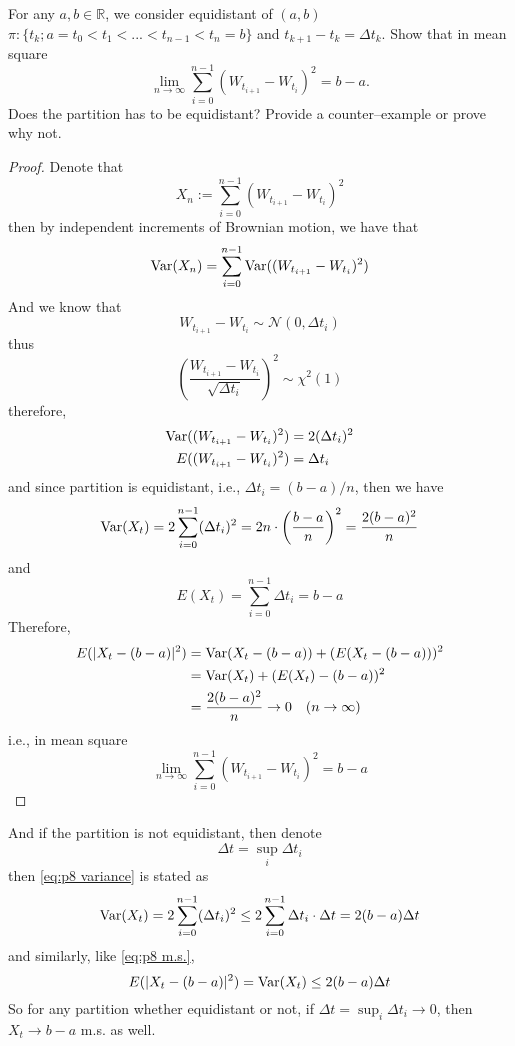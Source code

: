     \problem
    \begin{question}
        For any $a,b\in\mathbb R$, we consider equidistant of $(a,b)$
        $\pi:\{t_k; a=t_0<t_1<...<t_{n-1}<t_n=b\}$ and $t_{k+1}-t_k=\Delta t_k$.
        Show that in mean square
        \[\lim_{n\rightarrow\infty}\sum_{i=0}^{n-1}(W_{t_{i+1}}-W_{t_{i}})^2=b-a.\]
        Does the partition has to be equidistant? Provide a counter--example or prove why not.
    \end{question}
    \begin{proof}
        Denote that
        \[X_n:=\sum_{i=0}^{n-1}(W_{t_{i+1}}-W_{t_i})^2\]
        then by independent increments of  Brownian motion, we have that
        \[\mathrm{Var}(X_n)=\sum_{i=0}^{n-1}\mathrm{Var}((W_{t_{i+1}}-W_{t_i})^2)\]
        And we know that
        \[W_{t_{i+1}}-W_{t_i}\sim\mathcal N(0,\Delta t_i)\]
        thus
        \[\left(\frac{W_{t_{i+1}}-W_{t_i}}{\sqrt{\Delta t_i}}\right)^2
        \sim\chi^2(1)\]
        therefore,
        \[\begin{aligned}
            \mathrm{Var}((W_{t_{i+1}}-W_{t_i})^2)&=2(\Delta t_i)^2\\
            E((W_{t_{i+1}}-W_{t_i})^2)&=\Delta t_i
        \end{aligned}\]
        and since partition is equidistant, i.e., 
        $\Delta t_i=(b-a)/n$, then we have
        \begin{equation}
            \label{eq:p8 variance}
            \mathrm{Var}(X_t)=2\sum_{i=0}^{n-1}(\Delta t_i)^2
            =2n\cdot\left(\frac{b-a}{n}\right)^2
            =\frac{2(b-a)^2}{n}
        \end{equation}
        and
        \[E(X_t)=\sum_{i=0}^{n-1}\Delta t_i=b-a\]
        Therefore,
        \begin{equation}
            \label{eq:p8 m.s.}
            \begin{aligned}
            E(|X_t-(b-a)|^2)&=\mathrm{Var}(X_t-(b-a))+(E(X_t-(b-a)))^2\\
            &=\mathrm{Var}(X_t)+(E(X_t)-(b-a))^2\\
            &=\frac{2(b-a)^2}{n}\to 0\quad(n\to\infty)
            \end{aligned}
        \end{equation}
        i.e., in mean square
        \[\lim_{n\to\infty}\sum_{i=0}^{n-1}(W_{t_{i+1}}-W_{t_i})^2=b-a\]
    \end{proof}

    And if the partition is not equidistant, then denote
    \[\Delta t=\sup_{i}\Delta t_i\]
    then \cref{eq:p8 variance} is stated as
    \[\mathrm{Var}(X_t)=2\sum_{i=0}^{n-1}(\Delta t_i)^2
    \leq 2\sum_{i=0}^{n-1}\Delta t_i\cdot\Delta t
    =2(b-a)\Delta t\]
    and similarly, like \cref{eq:p8 m.s.},
    \[E(|X_t-(b-a)|^2)=\mathrm{Var}(X_t)\leq 2(b-a)\Delta t\]
    So for any partition whether equidistant or not,
    if $\Delta t=\sup_i\Delta t_i\to 0$,
    then $X_t\to b-a$ m.s. as well.

